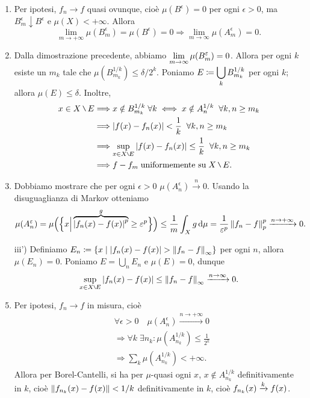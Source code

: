 \begin{enumerate}
	\item Per ipotesi, $f_n \to f$ quasi ovunque, cioè $\mu(B^\epsilon) = 0$ per ogni $\epsilon > 0$, ma $B_m^\epsilon \downarrow B^\epsilon$ e $\mu(X) < +\infty$.
	Allora
	$$
	\lim_{m \to +\infty} \mu(B_m^\epsilon) = \mu(B^\epsilon) = 0 \Longrightarrow \lim_{m \to \infty} \mu(A_m^\epsilon) = 0.
	$$

	\item Dalla dimostrazione precedente, abbiamo $\displaystyle \lim_{m \to \infty} \mu(B_m^\varepsilon) = 0$. 
	Allora per ogni $k$ esiste un $m_k$ tale che $\mu \left( B_{m_k}^{1/k} \right) \leq \delta / 2^k$.
	Poniamo $\displaystyle E \coloneqq  \bigcup_{k} B_{m_k}^{1/k}$ per ogni $k$; allora $\mu(E) \leq \delta$.
	Inoltre,
	\begin{align*}
	x \in X \setminus E & \Longrightarrow x \notin B_{m_k}^{1/k} \; \forall k \iff x \notin A_n^{1/k} \mquad \forall k,n \geq m_ k \\
	& \Longrightarrow \left| f(x) - f_n(x) \right| < \frac{1}{k} \mquad \forall k,n \geq m_k \\
	& \Longrightarrow \sup_{x \in X \setminus E} \left| f(x) - f_n(x) \right| \leq \frac{1}{k} \mquad \forall k,n \geq m_k \\
	& \Longrightarrow f - f_m \; \text{uniformemente su} \; X \setminus E.
	\end{align*}

	\item Dobbiamo mostrare che per ogni $\epsilon > 0$ $\mu(A_n^\epsilon) \xrightarrow{n} 0$.
	Usando la disuguaglianza di Markov otteniamo
		$$
		\mu(A_n^\varepsilon) 
		= \mu \Big( \Big\{ x \Big| \overbrace{\left| f_n(x) - f(x) \right|^p}^{g} \geq \varepsilon^p \Big\} \Big)
		\leq \frac{1}{m} \int_{X}^{} g \,\mathrm{d} \mu = \frac{1}{\varepsilon^p} \left\lVert f_n - f \right\rVert_p^p \xrightarrow{n \to +\infty} 0.
		$$

	\item[iii')] Definiamo $\displaystyle E_n \coloneqq  \left\{ x \;\middle|\; \left| f_n(x) - f(x) \right| > \left\lVert f_n - f \right\rVert_\infty \right\}$ per ogni $n$, allora $\mu(E_n) = 0$.
	Poniamo $E = \bigcup_{n} E_n$ e $\mu(E) = 0$, dunque
		$$
		\sup_{x \in X\setminus E} \left| f_n(x) - f(x) \right| \leq \norm{f_n - f}_\infty \xrightarrow{n \to \infty} 0.
		$$

	\item Per ipotesi, $f_n \to f$ in misura, cioè
		\begin{align*}
		& \forall \epsilon > 0 \quad \mu \left( A_n^\epsilon \right) \xrightarrow{n \to +\infty} 0 \\
		& \Longrightarrow \forall k \; \exists n_k \colon \mu \left( A_{n_k}^{1/k} \right) \leq \frac{1}{2^k} \\
		& \Longrightarrow \sum_{k}^{} \mu \left( A_{n_k}^{1/k} \right) < +\infty. 
		\end{align*}
		Allora per Borel-Cantelli, si ha per $\mu$-quasi ogni $x$, $x \notin A_{n_k}^{1/k}$ definitivamente in $k$, cioè $\left\lVert f_{n_k}(x) - f(x) \right\rVert < 1/k$ definitivamente in $k$, cioè $\displaystyle f_{n_k}(x) \xrightarrow{k} f(x)$.


\end{enumerate}
